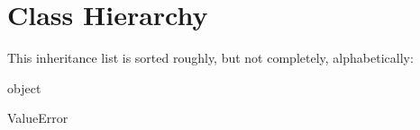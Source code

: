 \section{Class Hierarchy}
This inheritance list is sorted roughly, but not completely, alphabetically\-:\begin{DoxyCompactList}
\item object\begin{DoxyCompactList}
\item {}
\end{DoxyCompactList}
\item Value\-Error\begin{DoxyCompactList}
\item {}
\end{DoxyCompactList}
\end{DoxyCompactList}
